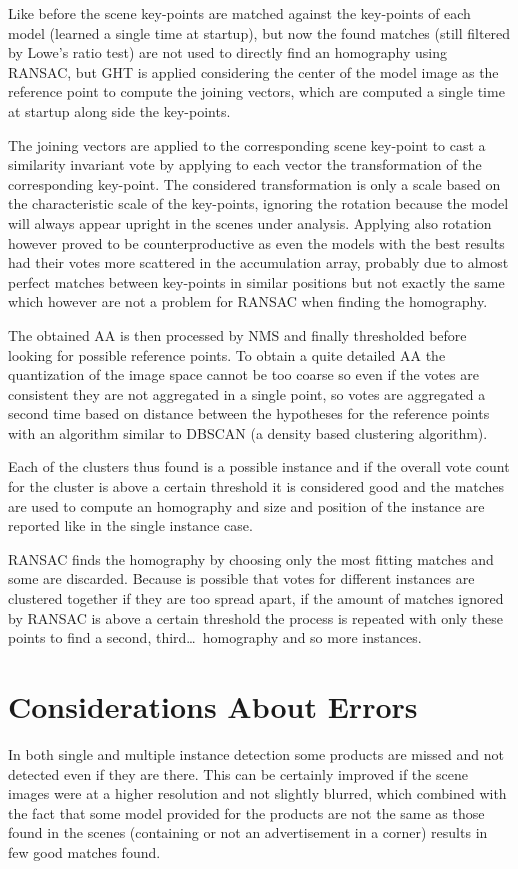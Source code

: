 Like before the scene key-points are matched against the key-points of each model (learned a single time at startup), but now the found matches (still filtered by Lowe's ratio test) are not used to directly find an homography using RANSAC, but GHT is applied considering the center of the model image as the reference point to compute the joining vectors, which are computed a single time at startup along side the key-points.

The joining vectors are applied to the corresponding scene key-point to cast a similarity invariant vote by applying to each vector the transformation of the corresponding key-point.
The considered transformation is only a scale based on the characteristic scale of the key-points, ignoring the rotation because the model will always appear upright in the scenes under analysis.
Applying also rotation however proved to be counterproductive as even the models with the best results had their votes more scattered in the accumulation array, probably due to almost perfect matches between key-points in similar positions but not exactly the same which however are not a problem for RANSAC when finding the homography.

The obtained AA is then processed by NMS and finally thresholded before looking for possible reference points.
To obtain a quite detailed AA the quantization of the image space cannot be too coarse so even if the votes are consistent they are not aggregated in a single point, so votes are aggregated a second time based on distance between the hypotheses for the reference points with an algorithm similar to DBSCAN (a density based clustering algorithm).

Each of the clusters thus found is a possible instance and if the overall vote count for the cluster is above a certain threshold it is considered good and the matches are used to compute an homography and size and position of the instance are reported like in the single instance case.

RANSAC finds the homography by choosing only the most fitting matches and some are discarded.
Because is possible that votes for different instances are clustered together if they are too spread apart, if the amount of matches ignored by RANSAC is above a certain threshold the process is repeated with only these points to find a second, third\ldots\ homography and so more instances.

\section{Considerations About Errors}
In both single and multiple instance detection some products are missed and not detected even if they are there.
This can be certainly improved if the scene images were at a higher resolution and not slightly blurred, which combined with the fact that some model provided for the products are not the same as those found in the scenes (\ie containing or not an advertisement in a corner) results in few good matches found.


